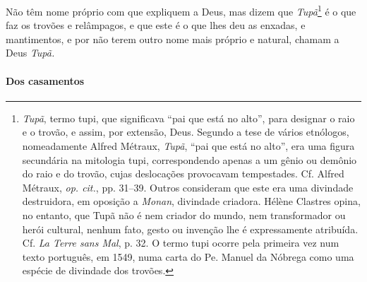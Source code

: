  Não têm nome próprio com que expliquem a Deus, mas dizem que
\textit{Tupã}\footnote{ \textit{Tupã}, termo tupi, que significava
``pai que está no alto'', para designar o raio e o trovão, e assim, por
extensão, Deus. Segundo a tese de vários etnólogos, nomeadamente
Alfred Métraux, \textit{Tupã}, ``pai que está no alto'', era uma figura
secundária na mitologia tupi, correspondendo apenas a um gênio ou
demônio do raio e do trovão, cujas deslocações provocavam tempestades.
Cf. Alfred Métraux, \textit{op. cit.}, pp. 31--39. Outros consideram
que este era uma divindade destruidora, em oposição a \textit{Monan}, 
divindade criadora. Hélène Clastres opina, no entanto, que Tupã não é
nem criador do mundo, nem transformador ou herói cultural, nenhum
fato, gesto ou invenção lhe é expressamente atribuída. Cf. \textit{La
Terre sans Mal}, p. 32. O termo tupi ocorre pela primeira vez num texto
português, em 1549, numa carta do Pe. Manuel da Nóbrega como
uma espécie de divindade dos trovões.} é o que faz os
trovões e relâmpagos, e que este é o que lhes deu as enxadas, e
mantimentos, e por não terem outro nome mais próprio e natural, chamam
a Deus \textit{Tupã.} 

\paragraph{Dos casamentos}

